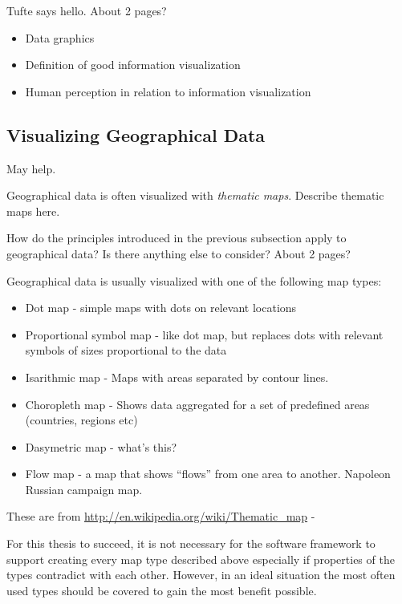 Tufte says hello. About 2 pages?

\begin{itemize}
\item Data graphics
\item Definition of good information visualization
\item Human perception in relation to information visualization
\end{itemize}

\subsection{Visualizing Geographical Data}

\citet[p. ~16]{tufte_visual_1986} May help.

Geographical data is often visualized with \emph{thematic maps}. Describe thematic maps here.

How do the principles introduced in the previous subsection apply to geographical data? Is there anything else to consider? About 2 pages?

Geographical data is usually visualized with one of the following map types:
\begin{itemize}
  \item Dot map - simple maps with dots on relevant locations
  \item Proportional symbol map - like dot map, but replaces dots with relevant symbols of sizes proportional to the data
  \item Isarithmic map - Maps with areas separated by contour lines.
  \item Choropleth map - Shows data aggregated for a set of predefined areas (countries, regions etc)
  \item Dasymetric map - what's this?
  \item Flow map - a map that shows ``flows'' from one area to another. Napoleon Russian campaign map.
\end{itemize}

These are from \url{http://en.wikipedia.org/wiki/Thematic_map} - 

For this thesis to succeed, it is not necessary for the software framework to support creating every map type described above especially if properties of the types contradict with each other. However, in an ideal situation the most often used types should be covered to gain the most benefit possible.

